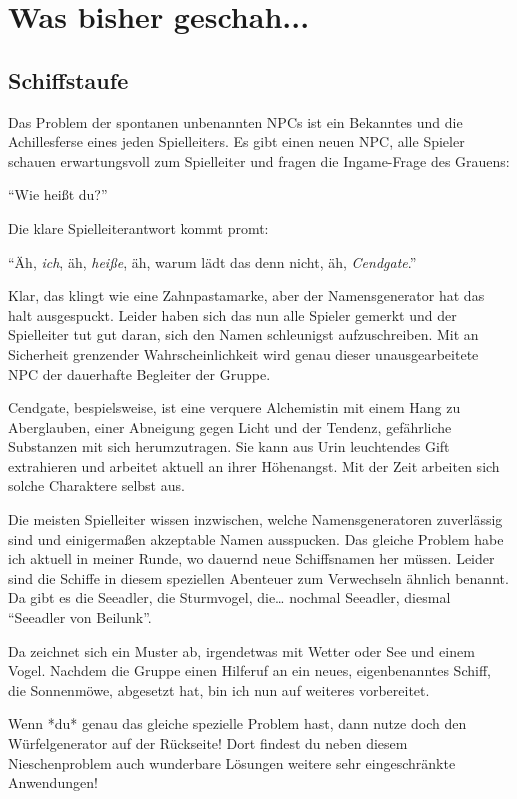 \documentclass[final]{multiversum}
\begin{document}
\makemultititle
%

\section{Was bisher geschah...}

\subsection{Schiffstaufe}
Das Problem der spontanen unbenannten NPCs ist ein Bekanntes und die Achillesferse eines jeden Spielleiters.
Es gibt einen neuen NPC, alle Spieler schauen erwartungsvoll zum Spielleiter und fragen die Ingame-Frage des Grauens:

\enquote{Wie heißt du?}

Die klare Spielleiterantwort kommt promt:

\enquote{Äh, \textit{ich}, äh, \textit{heiße}, äh, warum lädt das denn nicht, äh, \textit{Cendgate}.}

Klar, das klingt wie eine Zahnpastamarke, aber der Namensgenerator hat das halt ausgespuckt.
Leider haben sich das nun alle Spieler gemerkt und der Spielleiter tut gut daran, sich den Namen schleunigst aufzuschreiben.
Mit an Sicherheit grenzender Wahrscheinlichkeit wird genau dieser unausgearbeitete NPC der dauerhafte Begleiter der Gruppe.

Cendgate, bespielsweise, ist eine verquere Alchemistin mit einem Hang zu Aberglauben, einer Abneigung gegen Licht und der Tendenz, gefährliche Substanzen mit sich herumzutragen.
Sie kann aus Urin leuchtendes Gift extrahieren und arbeitet aktuell an ihrer Höhenangst.
Mit der Zeit arbeiten sich solche Charaktere selbst aus.

Die meisten Spielleiter wissen inzwischen, welche Namensgeneratoren zuverlässig sind und einigermaßen akzeptable Namen ausspucken.
Das gleiche Problem habe ich aktuell in meiner Runde, wo dauernd neue Schiffsnamen her müssen.
Leider sind die Schiffe in diesem speziellen Abenteuer zum Verwechseln ähnlich benannt.
Da gibt es die Seeadler, die Sturmvogel, die\dots{ }nochmal Seeadler, diesmal \enquote{Seeadler von Beilunk}.

Da zeichnet sich ein Muster ab, irgendetwas mit Wetter oder See und einem Vogel.
Nachdem die Gruppe einen Hilferuf an ein neues, eigenbenanntes Schiff, die Sonnenmöwe, abgesetzt hat, bin ich nun auf weiteres vorbereitet.

Wenn *du* genau das gleiche spezielle Problem hast, dann nutze doch den Würfelgenerator auf der Rückseite!
Dort findest du neben diesem Nieschenproblem auch wunderbare Lösungen weitere sehr eingeschränkte Anwendungen!
\end{document}
